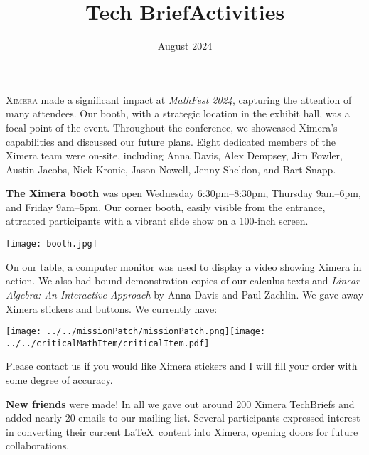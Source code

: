 \documentclass{techbrief}
\title{Tech Brief}
\title{Activities}
\date{August 2024}
\begin{document}
\pagestyle{main}
\thispagestyle{title}
\noindent

\lettrine[lines=2]{X}{imera} made a significant impact at \textit{MathFest
    2024},
capturing the attention of many attendees. Our booth, with a strategic location
in
the exhibit hall, was a focal point of the event. Throughout the conference, we
showcased Ximera's capabilities and discussed our future plans.
Eight dedicated members of the Ximera team were on-site, including Anna Davis,
Alex Dempsey, Jim Fowler, Austin Jacobs, Nick Kronic, Jason Nowell, Jenny
Sheldon, and Bart Snapp.


\begin{xframe}
    \textbf{The Ximera booth} was open Wednesday 6:30pm--8:30pm, Thursday
    9am--6pm, and Friday 9am--5pm. Our corner booth, easily visible from the
    entrance, attracted participants with a vibrant slide show on a 100-inch
    screen.
    \begin{center}
        \texttt{[image: booth.jpg]}
    \end{center}
    On our table, a computer monitor was used to display a video showing Ximera
    in action.
    We also had bound demonstration copies of our calculus texts and
    \textit{Linear Algebra: An Interactive Approach} by Anna Davis and Paul
    Zachlin.
    We gave away Ximera stickers and buttons. 
    We currently have:
    \begin{center}

        \texttt{[image: ../../missionPatch/missionPatch.png]}\qquad\texttt{[image: ../../criticalMathItem/criticalItem.pdf]}
    \end{center}
    Please contact us if you would like Ximera stickers and I will fill your
    order with some degree of accuracy.
\end{xframe}

\vspace*{-.8cm}
\begin{xframe}
    \textbf{New friends} were made! In all we gave out around 200 Ximera
    TechBriefs and added nearly 20 emails to our mailing list.	Several
    participants expressed interest in converting their current \LaTeX\ content
    into Ximera, opening doors for future collaborations.
\end{xframe}
\end{document}
